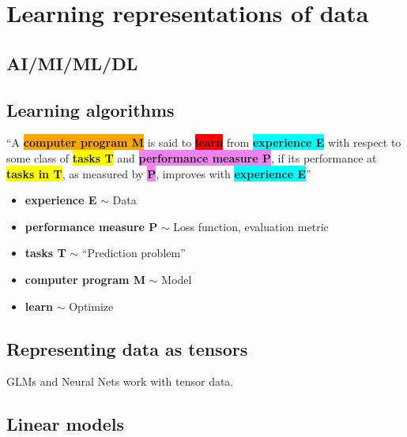 \section{Learning representations of data}
\subsection{AI/MI/ML/DL}
\begin{definition}
\end{definition}
\subsection{Learning algorithms}
\begin{definition}
    \textquotedblleft A \colorbox{orange}{\textbf{computer program M}} is said to \colorbox{red}{\textbf{learn}} from \colorbox{cyan}{\textbf{experience E}} with respect to some class of \colorbox{yellow}{\textbf{tasks T}} and \colorbox{violet}{\textbf{performance measure P}}, if its performance at \colorbox{yellow}{\textbf{tasks in T}}, as measured by \colorbox{violet}{\textbf{P}}, improves with \colorbox{cyan}{\textbf{experience E}}\textquotedblright
    \vspace{1em}

    \begin{itemize}
        \item \textbf{\color{cyan}experience E} $\sim$ Data
        \item \textbf{\color{violet}performance measure P} $\sim$ Loss function, evaluation metric
        \item \textbf{\color{yellow}tasks T} $\sim$ ``Prediction problem''
        \item \textbf{\color{orange}computer program M} $\sim$ Model
        \item \textbf{\color{red}learn} $\sim$ Optimize
    \end{itemize}
\end{definition}

\subsection{Representing data as tensors}
\begin{definition}
    GLMs and Neural Nets work with tensor data.
\end{definition}

\subsection{Linear models}
